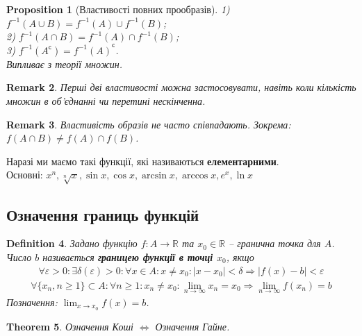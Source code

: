 \documentclass[a4paper, 14pt]{article}
\theoremstyle{theoremdd}
\newtheorem{theorem}{Theorem}[subsection]
\theoremstyle{theoremdd}
\newtheorem{definition}[theorem]{Definition}
\theoremstyle{theoremdd}
\theoremstyle{theoremdd}
\theoremstyle{theoremdd}
\newtheorem{proposition}[theorem]{Proposition}
\theoremstyle{theoremdd}
\newtheorem{remark}[theorem]{Remark}
\theoremstyle{theoremdd}
\theoremstyle{theoremdd}
\begin{document}
	\begin{proposition}[Властивості повних прообразів]
	1) $f^{-1}(A \cup B) = f^{-1}(A) \cup f^{-1}(B)$;\\
	2) $f^{-1}(A \cap B) = f^{-1}(A) \cap f^{-1}(B)$;\\
	3) $f^{-1}(A^\mathsf{c}) = {f^{-1}(A)}^\mathsf{c}$.\\
	\textit{Випливає з теорії множин.}
	\end{proposition}
	
	\begin{remark}
	Перші дві властивості можна застосовувати, навіть коли кількість множин в об'єднанні чи перетині нескінченна.
	\end{remark}
	
	\begin{remark}
	Властивість образів не часто співпадають. Зокрема: $f(A \cap B) \neq f(A) \cap f(B)$.
	\end{remark}
	
	Наразі ми маємо такі функції, які називаються \textbf{елементарними}.\\ Основні: $x^n, \sqrt[n]{x}, \sin x, \cos x, \arcsin x, \arccos x, e^x, \ln x$
	\fi
	
	\subsection{Означення границь функцій}
	\begin{definition}
	Задано функцію $f \colon A \to \mathbb{R}$ та $x_0 \in \mathbb{R}$ -- гранична точка для $A$.\\
	Число $b$ називається \textbf{границею функції в точці $x_0$}, якщо
	\begin{align*}
	\forall \varepsilon > 0: \exists \delta(\varepsilon) > 0: \forall x \in A: x \neq x_0: |x-x_0|<\delta \Rightarrow |f(x)-b|<\varepsilon \tag*{означення Коші}
	\end{align*}
	\begin{align*}
	\forall \{x_n, n \geq 1\}\subset A: \forall n \geq 1: x_n \neq x_0: \lim_{n \to \infty} x_n = x_0 \Rightarrow \lim_{n \to \infty} f(x_n) = b \tag*{означення Гайне}
	\end{align*}
	Позначення: $\displaystyle \lim_{x \to x_0} f(x) = b$.
	\end{definition}
	
	\begin{theorem}
	Означення Коші $\iff$ Означення Гайне.
	\end{theorem}
	
\end{document}
